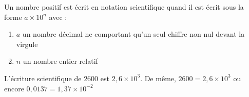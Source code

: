 \documentclass[a4paper,10pt]{report}
\begin{document}
\vspace{-3mm}
\begin{defn}
Un nombre positif est écrit en notation scientifique quand il est écrit sous la forme $a \times 10^n$ avec : 
\begin{enumerate}
\item[•]$a$ un nombre décimal ne comportant qu'un seul chiffre non nul devant la virgule
\item[•]$n$ un nombre entier relatif
\end{enumerate} 

\end{defn}

\begin{ex}
L'écriture scientifique de $2600$ est $2,6 \times 10^{3}$. De même, $2600 = 2,6 \times 10^3$ ou encore $0,0137 = 1,37 \times 10^{-2}$
\end{ex}
\end{document}
